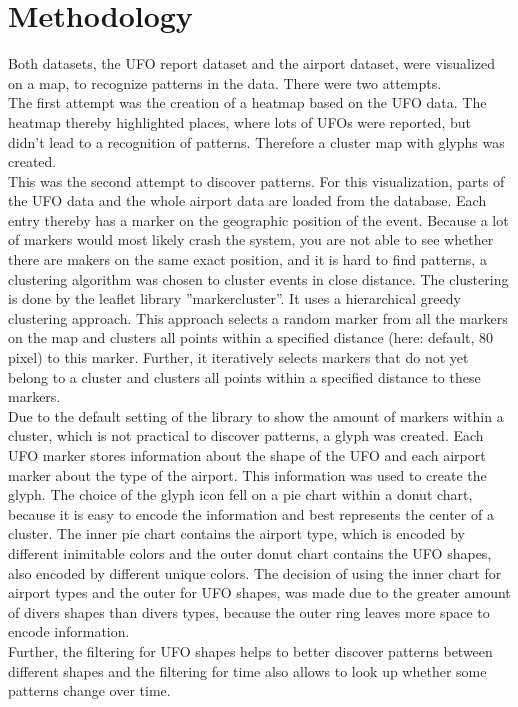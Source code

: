 \documentclass{article}
\begin{document}
\section*{Methodology}
Both datasets, the UFO report dataset and the airport dataset, were visualized on a map, to recognize patterns in the data. There were two attempts.\\
The first attempt was the creation of a heatmap based on the UFO data. The heatmap thereby highlighted places, where lots of UFOs were reported, but didn't lead to a recognition of patterns. Therefore a cluster map with glyphs was created.\\
This was the second attempt to discover patterns. For this visualization, parts of the UFO data and the whole airport data are loaded from the database. Each entry thereby has a marker on the geographic position of the event.
Because a lot of markers would most likely crash the system, you are not able to see whether there are makers on the same exact position, and it is hard to find patterns, a clustering algorithm was chosen to cluster events in close distance. The clustering is done by the leaflet library ''markercluster''. It uses a hierarchical greedy clustering approach. This approach selects a random marker from all the markers on the map and clusters all points within a specified distance (here: default, 80 pixel) to this marker. Further, it iteratively selects markers that do not yet belong to a cluster and clusters all points within a specified distance to these markers.\\
Due to the default setting of the library to show the amount of markers within a cluster, which is not practical to discover patterns, a glyph was created. Each UFO marker stores information about the shape of the UFO and each airport marker about the type of the airport. This information was used to create the glyph. The choice of the glyph icon fell on a pie chart within a donut chart, because it is easy to encode the information and best represents the center of a cluster. The inner pie chart contains the airport type, which is encoded by different inimitable colors and the outer donut chart contains the UFO shapes, also encoded by different unique colors. The decision of using the inner chart for airport types and the outer for UFO shapes, was made due to the greater amount of divers shapes than divers types, because the outer ring leaves more space to encode information.\\
Further, the filtering for UFO shapes helps to better discover patterns between different shapes and the filtering for time also allows to look up whether some patterns change over time.\\
\end{document}
